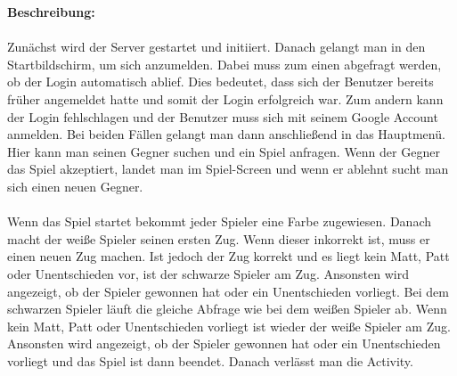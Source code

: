 \documentclass[parskip=full]{scrartcl}
\begin{document}
	\begin{description}
	
	\item \textbf{Beschreibung:}\\ \\
		Zunächst wird der Server gestartet und initiiert. Danach gelangt man in den Startbildschirm, um sich anzumelden. Dabei muss zum einen abgefragt werden, ob der Login automatisch ablief. Dies bedeutet, dass sich der Benutzer bereits früher angemeldet hatte und somit der Login erfolgreich war. Zum andern kann der Login fehlschlagen und der Benutzer muss sich mit seinem Google Account anmelden. Bei beiden Fällen gelangt man dann anschließend in das Hauptmenü. Hier kann man seinen Gegner suchen und ein Spiel anfragen. Wenn der Gegner das Spiel akzeptiert, landet man im Spiel-Screen und wenn er ablehnt sucht man sich einen neuen Gegner.\\ \\
		Wenn das Spiel startet bekommt jeder Spieler eine Farbe zugewiesen. Danach macht der weiße Spieler seinen ersten Zug. Wenn dieser inkorrekt ist, muss er einen neuen Zug machen. Ist jedoch der Zug korrekt und es liegt kein Matt, Patt oder Unentschieden vor, ist der schwarze Spieler am Zug. Ansonsten wird angezeigt, ob der Spieler gewonnen hat oder ein Unentschieden vorliegt. 
		Bei dem schwarzen Spieler läuft die gleiche Abfrage wie bei dem weißen Spieler ab. Wenn kein Matt, Patt oder Unentschieden vorliegt ist wieder der weiße Spieler am Zug. Ansonsten wird angezeigt, ob der Spieler gewonnen hat oder ein Unentschieden vorliegt und das Spiel ist dann beendet. Danach verlässt man die Activity.

\end{description}
\end{document}
